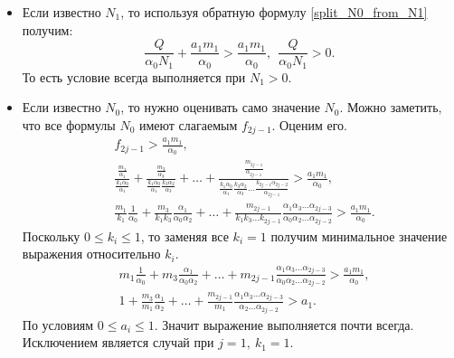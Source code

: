 \begin{itemize}
    \item Если известно \(N_1\), то используя обратную формулу \eqref{split_N0_from_N1} получим:
    \begin{equation*}
        \frac{Q}{\alpha_0 N_1} + \frac{a_1 m_1}{\alpha_0} > \frac{a_1 m_1}{\alpha_0}, ~~ \frac{Q}{\alpha_0 N_1} > 0.
    \end{equation*}
    То есть условие всегда выполняется при \(N_1 > 0\).

    \item Если известно \(N_0\), то нужно оценивать само значение \(N_0\). Можно заметить, что все формулы \(N_0\) имеют слагаемым \(f_{2j-1}\). Оценим его.
    \begin{equation} \label{split_f2jm1_stab}
        \begin{split}
            & f_{2j-1} > \frac{a_1 m_1}{\alpha_0}, \\
            & \frac{\frac{m_1}{\alpha_1}}{\frac{k_1 \alpha_0}{\alpha_1}} + \frac{\frac{m_3}{\alpha_3}}{\frac{k_1 \alpha_0}{\alpha_1} \frac{k_3 \alpha_2}{\alpha_3}} + \dots + \frac{\frac{m_{2j-1}}{\alpha_{2j-1}}}{\frac{k_1 \alpha_0}{\alpha_1} \frac{k_3 \alpha_2}{\alpha_3} \dots \frac{k_{2j-1} \alpha_{2j-2}}{\alpha_{2j-1}}} > \frac{a_1 m_1}{\alpha_0}, \\
            & \frac{m_1}{k_1} \frac{1}{\alpha_0} + \frac{m_3}{k_1 k_3} \frac{\alpha_1}{\alpha_0 \alpha_2} + \dots + \frac{m_{2j-1}}{k_1 k_3 \dots k_{2j-1}} \frac{\alpha_1 \alpha_3 \dots \alpha_{2j-3}}{\alpha_0 \alpha_2 \dots \alpha_{2j-2}}> \frac{a_1 m_1}{\alpha_0}.
        \end{split}
    \end{equation}
    Поскольку \(0 \leq k_i \leq 1\), то заменяя все \(k_i = 1\) получим минимальное значение выражения относительно \(k_i\).
    \begin{equation*}
        \begin{split}
            & m_1 \frac{1}{\alpha_0} + m_3 \frac{\alpha_1}{\alpha_0 \alpha_2} + \dots + m_{2j-1} \frac{\alpha_1 \alpha_3 \dots \alpha_{2j-3}}{\alpha_0 \alpha_2 \dots \alpha_{2j-2}}> \frac{a_1 m_1}{\alpha_0}, \\
            & 1 + \frac{m_3}{m_1} \frac{\alpha_1}{\alpha_2} + \dots + \frac{m_{2j-1}}{m_1} \frac{\alpha_1 \alpha_3 \dots \alpha_{2j-3}}{\alpha_2 \dots \alpha_{2j-2}} > a_1.
        \end{split}
    \end{equation*}
    По условиям \(0 \leq a_i \leq 1\). Значит выражение выполняется почти всегда. Исключением является случай при \(j = 1, ~ k_1 = 1\).
\end{itemize}

